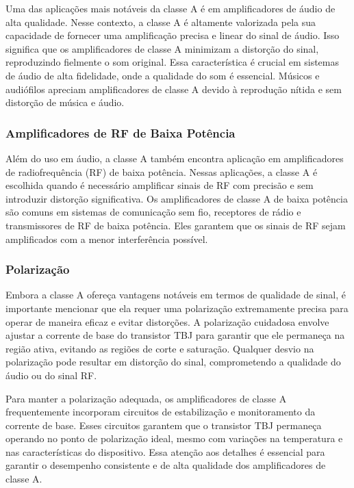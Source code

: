 Uma das aplicações mais notáveis da classe A é em amplificadores de áudio de alta qualidade. Nesse contexto, a classe A é altamente valorizada pela sua capacidade de fornecer uma amplificação precisa e linear do sinal de áudio. Isso significa que os amplificadores de classe A minimizam a distorção do sinal, reproduzindo fielmente o som original. Essa característica é crucial em sistemas de áudio de alta fidelidade, onde a qualidade do som é essencial. Músicos e audiófilos apreciam amplificadores de classe A devido à reprodução nítida e sem distorção de música e áudio.

\subsubsection{Amplificadores de RF de Baixa Potência}

Além do uso em áudio, a classe A também encontra aplicação em amplificadores de radiofrequência (RF) de baixa potência. Nessas aplicações, a classe A é escolhida quando é necessário amplificar sinais de RF com precisão e sem introduzir distorção significativa. Os amplificadores de classe A de baixa potência são comuns em sistemas de comunicação sem fio, receptores de rádio e transmissores de RF de baixa potência. Eles garantem que os sinais de RF sejam amplificados com a menor interferência possível.

\subsubsection{Polarização}

Embora a classe A ofereça vantagens notáveis em termos de qualidade de sinal, é importante mencionar que ela requer uma polarização extremamente precisa para operar de maneira eficaz e evitar distorções. A polarização cuidadosa envolve ajustar a corrente de base do transistor TBJ para garantir que ele permaneça na região ativa, evitando as regiões de corte e saturação. Qualquer desvio na polarização pode resultar em distorção do sinal, comprometendo a qualidade do áudio ou do sinal RF.

Para manter a polarização adequada, os amplificadores de classe A frequentemente incorporam circuitos de estabilização e monitoramento da corrente de base. Esses circuitos garantem que o transistor TBJ permaneça operando no ponto de polarização ideal, mesmo com variações na temperatura e nas características do dispositivo. Essa atenção aos detalhes é essencial para garantir o desempenho consistente e de alta qualidade dos amplificadores de classe A.

